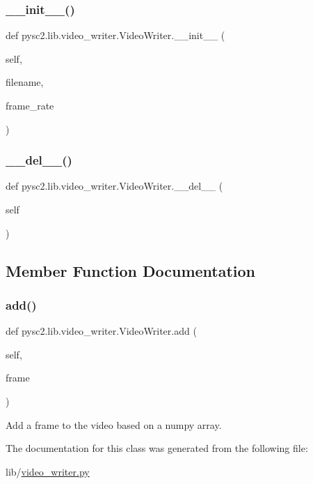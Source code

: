 \subsubsection{\texorpdfstring{\+\_\+\+\_\+init\+\_\+\+\_\+()}{\_\_init\_\_()}}
{\footnotesize\ttfamily def pysc2.\+lib.\+video\+\_\+writer.\+Video\+Writer.\+\_\+\+\_\+init\+\_\+\+\_\+ (\begin{DoxyParamCaption}\item[{}]{self,  }\item[{}]{filename,  }\item[{}]{frame\+\_\+rate }\end{DoxyParamCaption})}

\mbox{\label{classpysc2_1_1lib_1_1video__writer_1_1_video_writer_a7dfc204b28452a4b51ad4a8b4a91a573}} 
\subsubsection{\texorpdfstring{\+\_\+\+\_\+del\+\_\+\+\_\+()}{\_\_del\_\_()}}
{\footnotesize\ttfamily def pysc2.\+lib.\+video\+\_\+writer.\+Video\+Writer.\+\_\+\+\_\+del\+\_\+\+\_\+ (\begin{DoxyParamCaption}\item[{}]{self }\end{DoxyParamCaption})}



\subsection{Member Function Documentation}
\mbox{\label{classpysc2_1_1lib_1_1video__writer_1_1_video_writer_ac32683874f9d26bee99afc7806940cd6}} 
\subsubsection{\texorpdfstring{add()}{add()}}
{\footnotesize\ttfamily def pysc2.\+lib.\+video\+\_\+writer.\+Video\+Writer.\+add (\begin{DoxyParamCaption}\item[{}]{self,  }\item[{}]{frame }\end{DoxyParamCaption})}

\begin{DoxyVerb}Add a frame to the video based on a numpy array.\end{DoxyVerb}
 

The documentation for this class was generated from the following file\+:\begin{DoxyCompactItemize}
\item 
lib/\mbox{\hyperlink{video__writer_8py}{video\+\_\+writer.\+py}}\end{DoxyCompactItemize}
